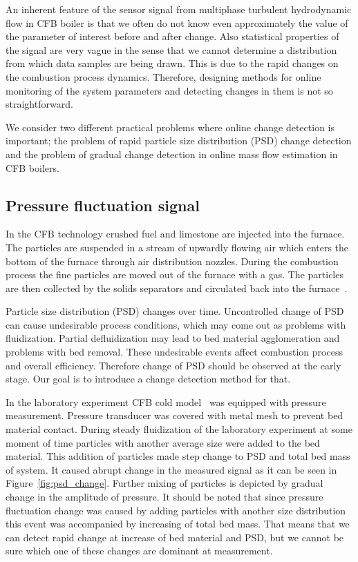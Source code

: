An inherent feature of the sensor signal from multiphase turbulent hydrodynamic flow in CFB boiler is that we often do not know
even approximately the value of the parameter of interest before and after change.
Also statistical properties of the signal are very vague in the sense that we cannot determine a distribution
from which data samples are being drawn.
This is due to the rapid changes on the combustion process dynamics.
Therefore, designing methods for online monitoring of the system parameters and detecting changes in them is not so straightforward.

We consider two different practical problems where online change detection is important; the problem of rapid particle size distribution (PSD) change detection and the problem of gradual change detection in online mass flow estimation in CFB boilers.

\subsection{Pressure fluctuation signal}

In the CFB technology crushed fuel and limestone are injected into the furnace.
The particles are suspended in a stream of upwardly flowing air which enters the bottom of the furnace through air distribution nozzles.
During the combustion process the fine particles are moved out of the furnace with a gas.
The particles are then collected by the solids separators and circulated back into the furnace~\cite{Kavidass}. 

Particle size distribution (PSD) changes over time. 
Uncontrolled change of PSD can cause undesirable process conditions, which may come out as problems with fluidization.
Partial defluidization may lead to bed material agglomeration and problems with bed removal.
These undesirable events affect combustion process and overall efficiency. Therefore change of PSD should be observed at the early stage.
Our goal is to introduce a change detection method for that.

In the laboratory experiment CFB cold model~\cite{Gulden} was equipped with pressure measurement. Pressure transducer was covered with metal mesh to prevent bed material contact.
During steady fluidization of the laboratory experiment at some moment of time particles with another average size were added to the bed material.
This addition of particles made step change to PSD and total bed mass of system.
It caused abrupt change in the measured signal as it can be seen in Figure~\ref{fig:psd_change}.
Further mixing of particles is depicted by gradual change in the amplitude of pressure.
It should be noted that since pressure fluctuation change was caused by adding particles with another size distribution this event was accompanied by increasing of total bed mass. That means that we can detect rapid change at increase of bed material and PSD, but we cannot be sure which one of these changes are dominant at measurement.

